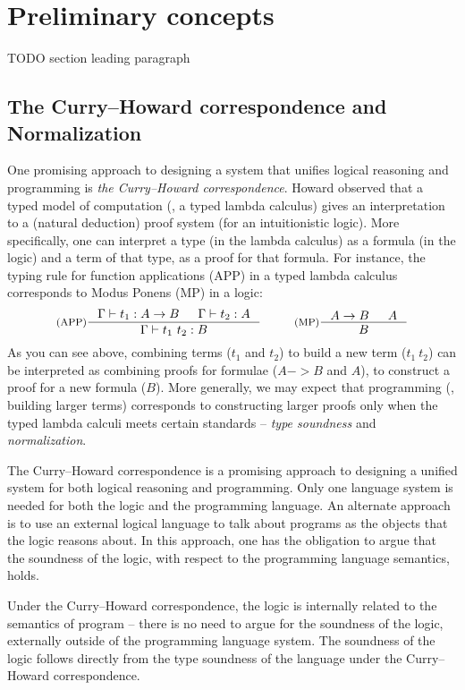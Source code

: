 \section{Preliminary concepts}\label{sec:intro:concepts}
TODO section leading paragraph

\subsection{The Curry--Howard correspondence and Normalization}
\label{sec:intro:concepts:CH}
One promising approach to designing a system that unifies
logical reasoning and programming is \emph{the Curry--Howard correspondence}.
Howard \cite{Howard69} observed that a typed model of computation
(\ie, a typed lambda calculus) gives an interpretation to a (natural deduction)
proof system (for an intuitionistic logic). More specifically, one can interpret
a type (in the lambda calculus) as a formula (in the logic) and
a term of that type, as a proof for that formula. For instance,
the typing rule for function applications (APP) in a typed lambda calculus
corresponds to Modus Ponens (MP) in a logic:
\[ \inference[(APP)]{\Gamma |- t_1 : A -> B & \Gamma |- t_2 : A}{
        \Gamma |- t_1~t_2 : B}
 ~~~~~~~~
   \inference[(MP)]{A -> B & A}{B}
\]
As you can see above, combining terms ($t_1$ and $t_2$) to build a new term
($t_1~t_2$) can be interpreted as combining proofs for formulae
($A -> B$ and $A$), to construct a proof for a new formula ($B$).
More generally, we may expect that programming (\ie, building larger terms)
corresponds to constructing larger proofs only when the typed lambda calculi
meets certain standards -- \emph{type soundness} and \emph{normalization}.

The Curry--Howard correspondence is a promising approach to designing a
unified system for both logical reasoning and programming. Only one language
system is needed for both the logic and the programming language. An
alternate approach is to use an external logical language to talk about
programs as the objects that the logic reasons about. In this approach, one
has the obligation to argue that the soundness of the logic, with respect to
the programming language semantics, holds.

Under the Curry--Howard correspondence, the logic is internally related to the
semantics of program -- there is no need to argue for the soundness of the
logic,  externally outside of the programming language system. The soundness
of the logic follows directly from the type soundness of the language under
the Curry--Howard correspondence.


